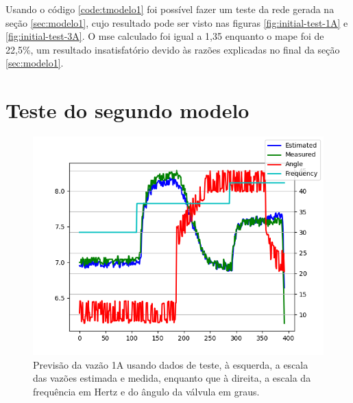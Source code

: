 \documentclass[12pt]{article}
\begin{document}
Usando o código \ref{code:tmodelo1} foi possível fazer um teste da rede gerada na seção \ref{sec:modelo1}, cujo resultado pode ser visto nas figuras \ref{fig:initial-test-1A} e \ref{fig:initial-test-3A}. O \acrshort{mse} calculado foi igual a 1,35 enquanto o \acrshort{mape} foi de 22,5\%, um resultado insatisfatório devido às razões explicadas no final da seção \ref{sec:modelo1}.

\section{Teste do segundo modelo}



\begin{figure}
    \centering
    \includegraphics{results/complete-test-1A.png}
    \caption{Previsão da vazão 1A usando dados de teste, à esquerda, a escala das vazões estimada e medida, enquanto que à direita, a escala da frequência em Hertz e do ângulo da válvula em graus.}
    \label{fig:complete-test-1A}
\end{figure}
\end{document}
